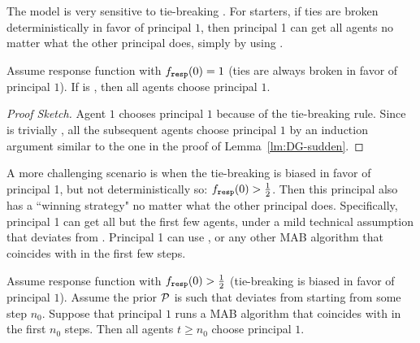 
The \HardMax model is very sensitive to tie-breaking . For starters, if ties are  broken deterministically in favor of principal $1$, then principal 1 can get all agents no matter what the other principal does, simply by using \StaticGreedy.

\begin{theorem}\label{thm:HardMax-hardTies}
Assume \HardMax response function with $f_{\mathtt{resp}}(0)=1$ (ties are always broken in favor of principal $1$). If \alg[1] is \StaticGreedy, then all agents choose principal $1$.
\end{theorem}

\begin{proof}[Proof Sketch]
Agent $1$ chooses principal $1$ because of the tie-breaking rule. Since \StaticGreedy is trivially \bmonotone, all the subsequent agents choose principal $1$ by an induction argument similar to the one in the proof of Lemma~\ref{lm:DG-sudden}.
\end{proof}



A more challenging scenario is when the tie-breaking is biased in favor of principal 1, but not deterministically so: $f_{\mathtt{resp}}(0)>\tfrac12$. Then this principal also has a ``winning strategy" no matter what the other principal does. Specifically, principal 1 can get all but the first few agents, under a mild technical assumption that \DynGreedy deviates from \StaticGreedy. Principal 1 can use \DynGreedy, or any other \bmonotone MAB algorithm that coincides with \DynGreedy in the first few steps.



\begin{theorem}\label{thm:HardMax-biased}
Assume \HardMax response function with $f_{\mathtt{resp}}(0)>\tfrac12$ (\ie tie-breaking is biased in favor of principal $1$). Assume the prior $\mathcal{P}$ is such that \DynGreedy deviates from \StaticGreedy starting from some step $n_0$. Suppose that principal $1$ runs a \bmonotone MAB algorithm that coincides with \DynGreedy in the first $n_0$ steps. Then all agents $t\geq n_0$ choose principal $1$.
\end{theorem}

